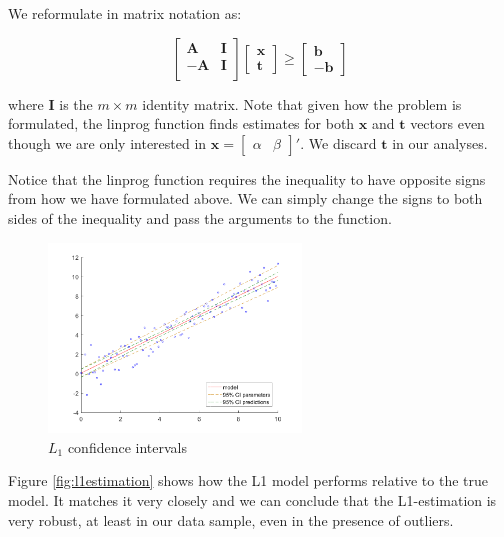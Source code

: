 We reformulate in matrix notation as:

\[
\begin{bmatrix}
\mathbf{A} & \mathbf{I} \\
\mathbf{-A} & \mathbf{I} \\

\end{bmatrix} 
\begin{bmatrix}
\mathbf{x}\\
\mathbf{t}
\end{bmatrix}
\geq 
\begin{bmatrix}
\mathbf{b}\\
-\mathbf{b}
\end{bmatrix}
\]

where $\mathbf{I}$ is the $m \times m$ identity matrix. Note that given how the problem is formulated, the linprog function finds estimates for both $\mathbf{x}$ and  $\mathbf{t}$ vectors even though we are only interested in $\mathbf{x} = \begin{bmatrix} \alpha & \beta \end{bmatrix}'$. We discard $\textbf{t}$ in our analyses. 

Notice that the linprog function requires the inequality to have opposite signs from how we have formulated above. We can simply change the signs to both sides of the inequality and pass the arguments to the function. 

\begin{figure}[htb]
\centering
\includegraphics[width=0.6\textwidth]{../img/L1_CI}
\caption{$L_1$ confidence intervals}
\label{fig:l1CI}
\end{figure}

Figure \ref{fig:l1estimation} shows how the L1 model performs relative to the true model. It matches it very closely and we can conclude that the L1-estimation is very robust, at least in our data sample, even in the presence of outliers.

